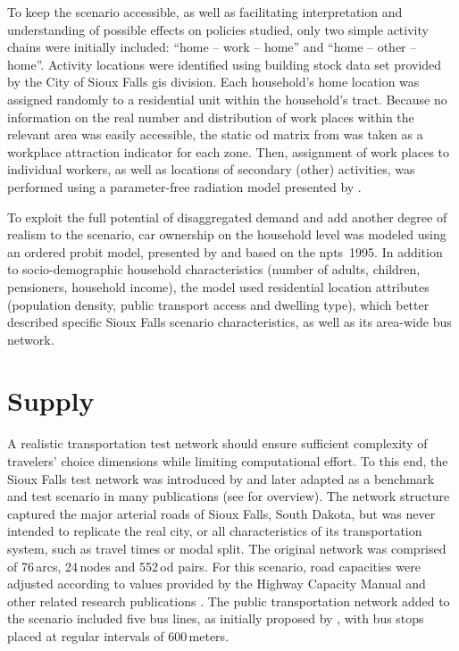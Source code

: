 To keep the scenario accessible, as well as facilitating interpretation and understanding of possible effects on policies studied, only two simple activity chains were initially included: ``home – work – home'' and ``home – other – home''. Activity locations were identified using building stock data set provided by the City of Sioux Falls \gls{gis} division. Each household's home location was assigned randomly to a residential unit within the household's tract. Because no information on the real number and distribution of work places within the relevant area was easily accessible, the static \gls{od} matrix from \citet[][]{LeBlancEtAl_TransRes_1975} was taken as a workplace attraction indicator for each zone. Then, assignment of work places to individual workers, as well as locations of secondary (other) activities, was performed using a parameter-free radiation model presented by \citet[][]{SiminiEtAl_NAT_2012}.

To exploit the full potential of disaggregated demand and add another degree of realism to the scenario, car ownership on the household level was modeled using an ordered probit model, presented by \citet[][]{GiulianoDargay_TransResA_2006} and based on the \gls{npts}~1995. In addition to socio-demographic household characteristics (number of adults, children, pensioners, household income), the model used residential location attributes (population density, public transport access and dwelling type), which better described specific Sioux Falls scenario characteristics, as well as its area-wide bus network. 

\section{Supply} 
A realistic transportation test network should ensure sufficient complexity of travelers’ choice dimensions while limiting  computational effort. To this end, the Sioux Falls test network was introduced by \citet[][]{MorlokEtAl_ResRep_org-fhwa_1973} and later adapted as a benchmark and test scenario in many publications (see \citet[][]{ChakirovFourie_TechRep_FCL_2014} for overview). The network structure captured the major arterial roads of Sioux Falls, South Dakota, but was never intended to replicate the real city, or all characteristics of its transportation system, such as travel times or modal split. The original network was comprised of 76\,arcs, 24\,nodes and 552\,\gls{od} pairs. For this scenario, road capacities were adjusted according to values provided by the Highway Capacity Manual \citet[][]{HCM_2010} and other related research publications \citep[e.g.,][]{NgCFSmall_Transportation_2012}. The public transportation network added to the scenario included five bus lines, as initially proposed by \citet[][]{AbdulaalLeBlanc_TransScience_1979}, with bus stops placed at regular intervals of 600\,meters. 

